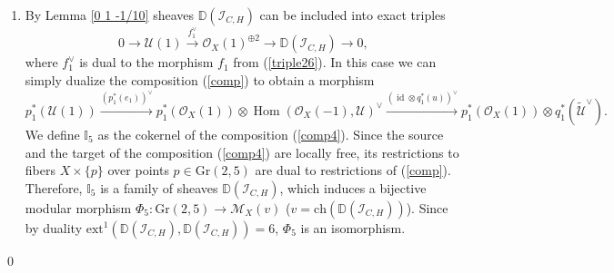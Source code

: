 \documentclass{amsart}
\DeclareMathOperator{\Hom}{Hom}
\def\id{\mathop{\mathrm{id}}\nolimits}
\begin{document}
\begin{enumerate}
Since the variety $\mathbb F$ is smooth and $\mathrm{ext}^1(\mathcal O_L,\mathcal O_H(1))=1$ independently of the point $(L,H)\in\mathbb F$, by \cite[Satz 3.(ii)]{BPS}, \cite[Theorem 1.4]{Lan} there is a line bundle
$$\mathcal A_{l,h}=\mathcal Ext_{q_4}^1(\mathbb I'_{o,l},\mathbb I_h\otimes p_4^*(\mathcal O_X(1)))$$
on $\mathbb F$, such that the fiber of $\mathcal A_{l,h}$ over the point $(L,H)$ is naturally isomorphic to $\mathrm{Ext}^1(\mathcal O_L,\mathcal O_H(1))$. Also, we have $\mathcal Ext_{q_4}^0(\mathbb I'_{o,l},\mathbb I_h\otimes p_4^*(\mathcal O_X(1)))=0$. Now \cite[Corollary 4.5]{Lan} implies that there is an universal extension $\mathbb I_4$ on $\mathbb P(\mathcal A_{l,h}^\vee)\times X\times \mathbb F\cong X\times \mathbb F$
$$0\to\mathbb I_h\otimes p_4^*(\mathcal O_X(1))\to\mathbb I_4\to \mathbb I'_{o,l}\to 0,$$
such that the fiber of $\mathbb I_4$ over the point $(L,H)\in\mathbb F$ is a nontrivial extension of $\mathcal O_L$ by $\mathcal O_H(1)$, which is isomorphic to $\mathbb D(\mathcal I_{L,H})$. The family $\mathbb I_4$ induces a bijective morphism $\Phi_4:\mathbb F\to\mathcal M_X(v))$ (here $v=\mathrm{ch}(\mathbb D(\mathcal I_{L,H})$), which is an isomorphism, since $\mathrm{ext}^1(\mathbb D(\mathcal I_{L,H}),\mathbb D(\mathcal I_{L,H}))=6$ (by duality).

\item 
By Lemma \ref{0 1 -1/10} sheaves $\mathbb D(\mathcal I_{C,H})$ can be included into exact triples
\begin{equation}\label{triple30}0\to\mathcal U(1)\overset{f_1^\vee}{\to}\mathcal O_X(1)^{\oplus 2}\to \mathbb D(\mathcal I_{C,H})\to 0,\end{equation}
where $f_1^\vee$ is dual to the morphism $f_1$ from (\ref{triple26}). In this case we can simply dualize the composition (\ref{comp}) to obtain a morphism
\begin{equation}\label{comp4}p_1^*(\mathcal U(1))\overset{(p_1^*(e_1))^\vee}{\to}p_1^*(\mathcal O_X(1))\otimes\Hom(\mathcal O_X(-1),\mathcal U)^\vee\overset{(\id\otimes q_1^*(u))^\vee}{\to}p_1^*(\mathcal O_X(1))\otimes q_1^*(\widetilde{\mathcal U}^\vee). 
\end{equation}
We define $\mathbb I_5$ as the cokernel of the composition (\ref{comp4}). Since the source and the target of the composition (\ref{comp4}) are locally free, its restrictions to fibers $X\times\{p\}$ over points $p\in\mathrm{Gr}(2,5)$ are dual to restrictions of (\ref{comp}). Therefore, $\mathbb I_5$ is a family of sheaves $\mathbb D(\mathcal I_{C,H})$, which induces a bijective modular morphism $\Phi_5:\mathrm{Gr}(2,5)\to\mathcal M_X(v)$ ($v=\mathrm{ch}(\mathbb D(\mathcal I_{C,H}))$). Since by duality $\mathrm{ext}^1(\mathbb D(\mathcal I_{C,H}),\mathbb D(\mathcal I_{C,H}))=6$, $\Phi_5$ is an isomorphism.
\end{enumerate}\qed
\end{document}
